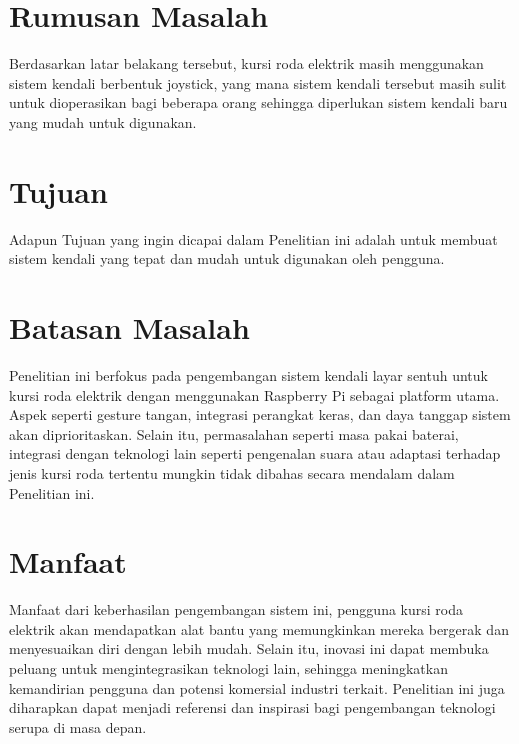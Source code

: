 \section{Rumusan Masalah}

Berdasarkan latar belakang tersebut, kursi roda elektrik masih menggunakan sistem kendali berbentuk joystick, yang mana sistem kendali tersebut masih sulit untuk dioperasikan bagi beberapa orang sehingga diperlukan sistem kendali baru yang mudah untuk digunakan.


\section{Tujuan}

Adapun Tujuan yang ingin dicapai dalam Penelitian ini adalah untuk membuat sistem kendali yang tepat dan mudah untuk digunakan oleh pengguna.


\section{Batasan Masalah}

Penelitian ini berfokus pada pengembangan sistem kendali layar sentuh untuk kursi roda elektrik dengan menggunakan Raspberry Pi sebagai platform utama. Aspek seperti gesture tangan, integrasi perangkat keras, dan daya tanggap sistem akan diprioritaskan. Selain itu, permasalahan seperti masa pakai baterai, integrasi dengan teknologi lain seperti pengenalan suara atau adaptasi terhadap jenis kursi roda tertentu mungkin tidak dibahas secara mendalam dalam Penelitian ini. 


\section{Manfaat}

Manfaat dari keberhasilan pengembangan sistem ini, pengguna kursi roda elektrik akan mendapatkan alat bantu yang memungkinkan mereka bergerak dan menyesuaikan diri dengan lebih mudah. Selain itu, inovasi ini dapat membuka peluang untuk mengintegrasikan teknologi lain, sehingga meningkatkan kemandirian pengguna dan potensi komersial industri terkait. Penelitian ini juga diharapkan dapat menjadi referensi dan inspirasi bagi pengembangan teknologi serupa di masa depan.
